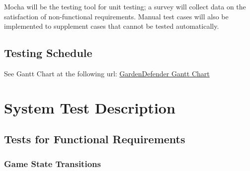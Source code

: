 \documentclass[12pt, titlepage]{article}
\begin{document}
Mocha will be the testing tool for unit testing; a survey will collect data on  the satisfaction of non-functional requirements. Manual test cases will also be implemented to supplement cases that cannot be tested automatically. 

\subsection{Testing Schedule}
		
See Gantt Chart at the following url: \href{https://gitlab.cas.mcmaster.ca/shiy12/3XA3Group29/blob/master/Game1/ProjectSchedule/ProjectSchedule.pdf}{GardenDefender Gantt Chart} 

\section{System Test Description}
	
\subsection{Tests for Functional Requirements}

\subsubsection{Game State Transitions}
\end{document}
